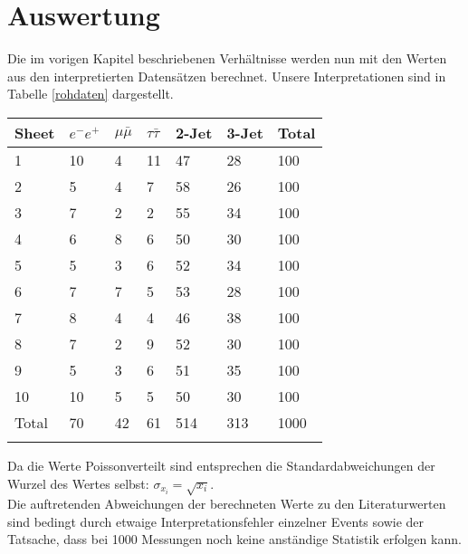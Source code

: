 \documentclass{include/thesisclass3}
\begin{document}
\chapter{Auswertung}
Die im vorigen Kapitel beschriebenen Verhältnisse werden nun mit den Werten aus den interpretierten Datensätzen berechnet. Unsere Interpretationen sind in Tabelle \ref{rohdaten} dargestellt.\\
\begin{center}
\begin{tabular}{   l | l | l | l | l | l | l   }
	Sheet & $e^-e^+$ & $\mu\bar{\mu}$ & $\tau\bar{\tau}$ & 2-Jet & 3-Jet & Total \\\hline
	1 & 10 & 4 & 11 & 47 & 28 & 100 \\ 
	2 & 5 & 4 & 7 & 58 & 26 & 100 \\ 
	3 & 7 & 2 & 2 & 55 & 34 & 100 \\ 
	4 & 6 & 8 & 6 & 50 & 30 & 100 \\ 
	5 & 5 & 3 & 6 & 52 & 34 & 100 \\ 
	6 & 7 & 7 & 5 & 53 & 28 & 100 \\ 
	7 & 8 & 4 & 4 & 46 & 38 & 100 \\ 
	8 & 7 & 2 & 9 & 52 & 30 & 100 \\ 
	9 & 5 & 3 & 6 & 51 & 35 & 100 \\ 
	10 & 10 & 5 & 5 & 50 & 30 & 100 \\ \hline
	Total & 70 & 42 & 61 & 514 & 313 & 1000 \\
	\label{rohdaten}
\end{tabular}
\end{center}
Da die Werte Poissonverteilt sind entsprechen die Standardabweichungen der Wurzel des Wertes selbst: $\sigma_{x_i}=\sqrt{x_i}$.\\
Die auftretenden Abweichungen der berechneten Werte zu den Literaturwerten sind bedingt durch etwaige Interpretationsfehler einzelner Events sowie der Tatsache, dass bei 1000 Messungen noch keine anständige Statistik erfolgen kann.
\end{document}
